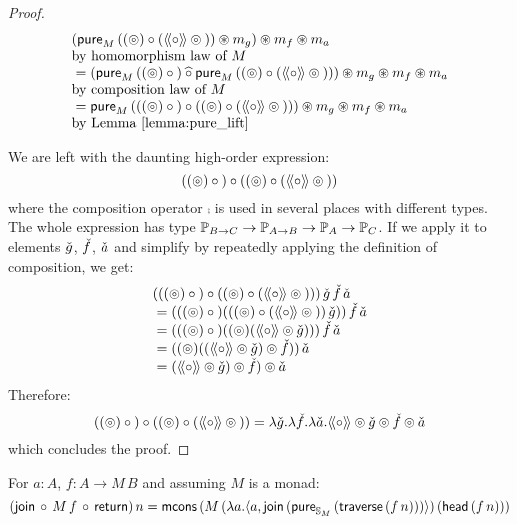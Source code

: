 \begin{proof}
$$\begin{array}{ll}
     (\mathsf{pure}_M\,((\circledcirc) \circ (\mathopen{\langle\!\langle}{\circ}\mathclose{\rangle\!\rangle} \circledcirc {}))
       \circledast m_g)
    \circledast m_f \circledast m_a\\
 \mbox{by homomorphism law of }M\\
{}= (\mathsf{pure}_M\,((\circledcirc) \circ {}) \mathbin{\widehat{\circ}}
     \mathsf{pure}_M\,((\circledcirc) \circ (\mathopen{\langle\!\langle}{\circ}\mathclose{\rangle\!\rangle} \circledcirc {})))
    \circledast m_g \circledast m_f \circledast m_a\\
\mbox{by composition law of }M\\
{}= \mathsf{pure}_M\,(((\circledcirc) \circ {}) \circ
                ((\circledcirc) \circ (\mathopen{\langle\!\langle}{\circ}\mathclose{\rangle\!\rangle} \circledcirc {})))
    \circledast m_g \circledast m_f \circledast m_a\\
\mbox{by Lemma \ref{lemma:pure_lift}}
\end{array}
$$

We are left with the daunting high-order expression:
$$
((\circledcirc) \circ {}) \circ ((\circledcirc) \circ (\mathopen{\langle\!\langle}{\circ}\mathclose{\rangle\!\rangle} \circledcirc {}))
$$
where the composition operator $\comp$ is used in several places with different types.
The whole expression has type $\mathbb{P}_{B\rightarrow C}\rightarrow \mathbb{P}_{A\rightarrow B} \rightarrow \mathbb{P}_{A}\rightarrow \mathbb{P}_{C}$.
If we apply it to elements $\check{g}$, $\check{f}$, $\check{a}$ and simplify by repeatedly applying the definition of composition, we get:
$$
\begin{array}{l}
(((\pappl) \comp {}) \comp ((\pappl) \comp (\ppair{\comp} \pappl {})))\,
\pstr{g}\,\pstr{f}\,\pstr{a}\\
{}= (((\pappl) \comp {}) (((\pappl) \comp (\ppair{\comp} \pappl {}))\,\pstr{g}))\,
    \pstr{f}\,\pstr{a}\\
{}= (((\pappl) \comp {}) ((\pappl) (\ppair{\comp} \pappl\pstr{g})))\,
    \pstr{f}\,\pstr{a}\\
{}= ((\pappl) ((\ppair{\comp} \pappl\pstr{g}) \pappl \pstr{f}))\,\pstr{a}\\
{}= (\ppair{\comp} \pappl\pstr{g}) \pappl \pstr{f})\pappl\pstr{a}\\
\end{array}
$$
Therefore:
$$
((\circledcirc) \circ {}) \circ ((\circledcirc) \circ (\mathopen{\langle\!\langle}{\circ}\mathclose{\rangle\!\rangle} \circledcirc {}))
= \lambda \check{g}. \lambda \check{f}. \lambda \check{a}.
  \mathopen{\langle\!\langle}{\circ}\mathclose{\rangle\!\rangle} \circledcirc\check{g} \circledcirc \check{f} \circledcirc\check{a}
$$
which concludes the proof.
\end{proof}


\begin{lemmaa}{18}\label{lemma:general_bind_law}
For $a : A$, $f : A \rightarrow M\, B$ and assuming $M$ is a monad:
$$
(\mathsf{join}\, \circ\,  M\, f\, \circ\, \mathsf{return})\, n = \mathsf{mcons}\, (M\,(\lambda a . \langle a, \mathsf{join}\, (\mathsf{pure}_{\mathbb{S}_{M}}\, (\mathsf{traverse}\, (f\, n))) \rangle)\, (\mathsf{head}\, (f\, n)))
$$
\end{lemmaa}

